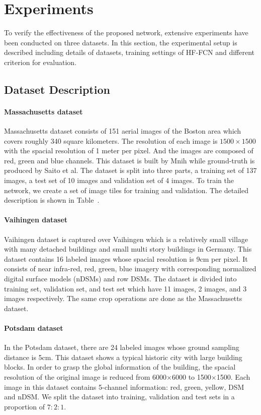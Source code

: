 \section{Experiments}
\label{Sec:exp}

To verify the effectiveness of the proposed network, extensive experiments have been conducted on three datasets. In this section, the experimental setup is described including details of datasets, training settings of HF-FCN and different criterion for evaluation.


\subsection{Dataset Description}

\paragraph{Massachusetts dataset}
%
Massachusetts dataset consists of 151 aerial images of the Boston area which covers roughly 340 square kilometers. 
The resolution of each image is $1500\times 1500$ with the spacial resolution of 1 meter per pixel. And the images are composed of red, green and blue channels. 
This dataset is built by Mnih while ground-truth is produced by Saito et al.
The dataset is split into three parts,  a training set of 137 images, a test set of 10 images and validation set of 4 images. 
To train the network, we create a set of image tiles for training and validation. The detailed description is shown in Table~\cite{table:xxxx}.

\paragraph{Vaihingen dataset}
%
Vaihingen dataset is captured over Vaihingen which is a relatively small village with many detached buildings and small multi story buildings in Germany.  
This dataset contains 16 labeled images whose spacial resolution is 9cm per pixel. 
It consists of near infra-red, red, green, blue imagery with corresponding normalized digital surface models (nDSMs) and row DSMs. The dataset is divided into training set, validation set, and test set which have 11 images, 2 images, and 3 images respectively. The same crop operations are done as the Massachusetts dataset. 

\paragraph{Potsdam dataset}
%
In the Potsdam dataset, there are 24 labeled images whose ground sampling distance is 5cm. 
This dataset shows a typical historic city with large building blocks. In order to grasp the global information of the building, the spacial resolution of the original image is reduced from 6000$\times$6000 to 1500$\times$1500. 
Each image in this dataset contains 5-channel information: red, green, yellow, DSM and nDSM. 
We split the dataset into training, validation and test sets in a proportion of $7:2:1$.



